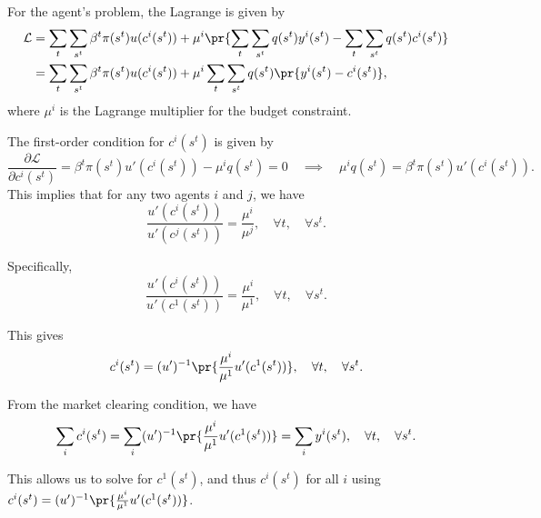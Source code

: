 
For the agent's problem, the Lagrange is given by
\[
\begin{aligned}
    \mathcal{L} & = \sum_t\sum_{s^t}\beta^t\pi(s^t)u(c^i(s^t)) + \mu^i\pr{\sum_t\sum_{s^t} q(s^t)y^i(s^t) - \sum_t\sum_{s^t} q(s^t)c^i(s^t)}\\
    & = \sum_t\sum_{s^t}\beta^t\pi(s^t)u(c^i(s^t)) + \mu^i \sum_t\sum_{s^t}q(s^t)\pr{y^i(s^t) - c^i(s^t)},
\end{aligned}
\]
where $\mu^i$ is the Lagrange multiplier for the budget constraint. 

The first-order condition for $c^i(s^t)$ is given by
\[
\frac{\partial \mathcal{L}}{\partial c^i(s^t)} = \beta^t \pi(s^t) u'(c^i(s^t)) - \mu^i q(s^t) = 0 \quad \implies \quad \mu^i q(s^t) = \beta^t \pi(s^t) u'(c^i(s^t)).
\]
This implies that for any two agents $i$ and $j$, we have
\[
\frac{u'(c^i(s^t))}{u'(c^j(s^t))}  = \frac{\mu^i}{\mu^j}, \quad \forall t, \quad \forall s^t.
\]

Specifically,
\[
\frac{u'(c^i(s^t))}{u'(c^1(s^t))}  = \frac{\mu^i}{\mu^1}, \quad \forall t, \quad \forall s^t.
\]

This gives
\[
c^i(s^t) = (u')^{-1}\pr{\frac{\mu^i}{\mu^1} u'(c^1(s^t))}, \quad \forall t, \quad \forall s^t.
\] 

From the market clearing condition, we have
\[
\sum_i c^i(s^t) = \sum_i (u')^{-1}\pr{\frac{\mu^i}{\mu^1} u'(c^1(s^t))} = \sum_i y^i(s^t), \quad \forall t, \quad \forall s^t.
\]

This allows us to solve for $c^1(s^t)$, and thus $c^i(s^t)$ for all $i$ using $c^i(s^t) = (u')^{-1}\pr{\frac{\mu^i}{\mu^1} u'(c^1(s^t))}$.


